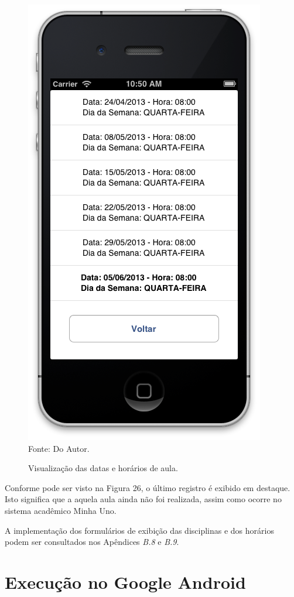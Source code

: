 \begin{figure}[!htb]
     \centering
     \caption[Formulário Horários do Semestre - Visualização dos Horários]{Visualização das datas e horários de aula.}
     \includegraphics[scale=0.34]{imagens/formconsultahorariosemestredisciplina.png}
     \\  Fonte: Do Autor.
\end{figure}
\newpage

Conforme pode ser visto na Figura 26, o último registro é exibido em destaque. Isto significa que a aquela aula ainda não foi realizada, assim como ocorre no sistema acadêmico Minha Uno.

A implementação dos formulários de exibição das disciplinas e dos horários podem ser consultados nos Apêndices \emph{B.8} e \emph{B.9}.

\section{Execução no Google Android}
